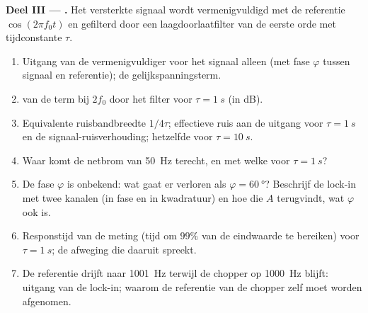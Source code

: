 \begin{problem}
\medskip
\noindent\textbf{Deel III --- .}
Het versterkte signaal wordt vermenigvuldigd met de referentie
$\cos(2\pi f_0t)$ en gefilterd door een laagdoorlaatfilter van de eerste
orde met tijdconstante $\tau$.
\begin{enumerate}[resume]
  \item Uitgang van de vermenigvuldiger voor het signaal alleen (met fase
        $\varphi$ tussen signaal en referentie); de gelijkspanningsterm.
  \item {} van de term bij $2f_0$ door het filter voor
        $\tau = \qty{1}{s}$ (in dB).
  \item Equivalente ruisbandbreedte $1/4\tau$; effectieve ruis aan de
        uitgang voor $\tau = \qty{1}{s}$ en de signaal-ruisverhouding;
        hetzelfde voor $\tau = \qty{10}{s}$.
  \item Waar komt de netbrom van \qty{50}{Hz} terecht, en met welke
         voor $\tau = \qty{1}{s}$?
  \item De fase $\varphi$ is onbekend: wat gaat er verloren als
        $\varphi = \qty{60}{\degree}$? Beschrijf de lock-in met twee kanalen
        (in fase en in kwadratuur) en hoe die $A$ terugvindt, wat $\varphi$
        ook is.
  \item Responstijd van de meting (tijd om $99\%$ van de eindwaarde te
        bereiken) voor $\tau = \qty{1}{s}$; de afweging die daaruit spreekt.
  \item De referentie drijft naar \qty{1001}{Hz} terwijl de chopper op
        \qty{1000}{Hz} blijft: uitgang van de lock-in; waarom de referentie
        van de chopper zelf moet worden afgenomen.
\end{enumerate}


\end{problem}
